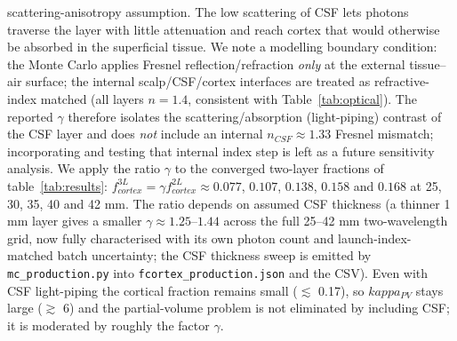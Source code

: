\documentclass[11pt]{article}
\def\kappa{kappa}%
\def\mathrm#1{#1}%
\def\,{ }%
\begin{document}
scattering-anisotropy assumption. The low scattering of CSF lets photons traverse the layer with little attenuation and reach cortex that would otherwise be absorbed in the superficial tissue. We note a modelling boundary condition: the Monte Carlo applies Fresnel reflection/refraction \emph{only} at the external tissue--air surface; the internal scalp/CSF/cortex interfaces are treated as refractive-index matched (all layers $n=1.4$, consistent with Table~\ref{tab:optical}). The reported $\gamma$ therefore isolates the scattering/absorption (light-piping) contrast of the CSF layer and does \emph{not} include an internal $n_{\mathrm{CSF}}\approx1.33$ Fresnel mismatch; incorporating and testing that internal index step is left as a future sensitivity analysis. We apply the ratio $\gamma$ to the converged two-layer fractions of table~\ref{tab:results}: $f_{\mathrm{cortex}}^{\mathrm{3L}} = \gamma\,f_{\mathrm{cortex}}^{\mathrm{2L}} \approx 0.077$, $0.107$, $0.138$, $0.158$ and $0.168$ at 25, 30, 35, 40 and 42\,mm. The ratio depends on assumed CSF thickness (a thinner 1\,mm layer gives a smaller $\gamma\approx1.25$--$1.44$ across the full 25--42\,mm two-wavelength grid, now fully characterised with its own photon count and launch-index-matched batch uncertainty; the CSF thickness sweep is emitted by \texttt{mc\_production.py} into \texttt{fcortex\_production.json} and the CSV). Even with CSF light-piping the cortical fraction remains small ($\lesssim$\,0.17), so $\kappa_{\mathrm{PV}}$ stays large ($\gtrsim$\,6) and the partial-volume problem is not eliminated by including CSF; it is moderated by roughly the factor $\gamma$.
\end{document}
